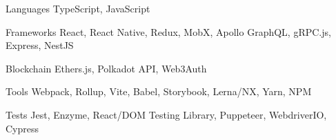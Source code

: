 

\begin{cvskills}

  \cvskill
    {Languages} %
    {TypeScript, JavaScript} %

  \cvskill
    {Frameworks} %
    {React, React Native, Redux, MobX, Apollo GraphQL, gRPC.js, Express, NestJS} %

  \cvskill
    {Blockchain} %
    {Ethers.js, Polkadot API, Web3Auth} %

  \cvskill
    {Tools} %
    {Webpack, Rollup, Vite, Babel, Storybook, Lerna/NX, Yarn, NPM} %

  \cvskill
    {Tests} %
    {Jest, Enzyme, React/DOM Testing Library, Puppeteer, WebdriverIO, Cypress} %

\end{cvskills}
